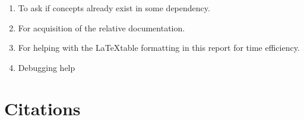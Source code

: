 \documentclass[12pt, a4paper]{article}
\begin{document}
\begin{multicols}{2}
    \begin{enumerate} \label{enm:llm}
        \item To ask if concepts already exist in some dependency.
        \item For acquisition of the relative documentation.
        \item For helping with the \LaTeX table formatting in this report for time efficiency.
        \item Debugging help
    \end{enumerate}

    \section{Citations} \label{sec:citations}

    \printbibliography

\end{multicols}
\end{document}
